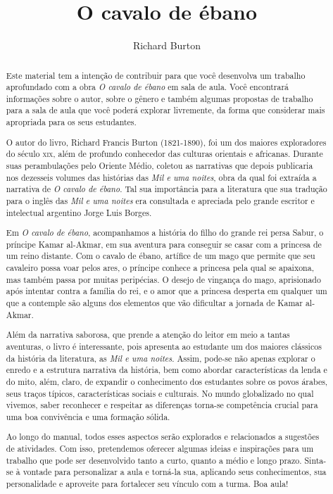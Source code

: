 \documentclass[11pt]{extarticle}
\newcommand{\AutorLivro}{Richard Burton}
\newcommand{\TituloLivro}{O cavalo de ébano}
\newcommand{\colaborador}{Paulo Pompermaier}
\begin{document}
\title{\TituloLivro}
\author{\AutorLivro}
\def\authornotes{\colaborador}

\date{}
\maketitle

\tableofcontents

\begin{abstract}
Este material tem a intenção de contribuir para que você desenvolva um trabalho aprofundado com a obra \textit{O cavalo de ébano} em sala de aula.
Você encontrará informações sobre o autor, sobre o gênero e também 
algumas propostas de trabalho para a sala de aula que você poderá explorar livremente, 
da forma que considerar mais apropriada para os seus estudantes.

O autor do livro, Richard Francis Burton (1821-1890), foi um dos maiores
exploradores do século \textsc{xix}, além de profundo conhecedor das culturas orientais e africanas. Durante suas perambulações pelo Oriente Médio, coletou as narrativas que depois publicaria nos dezesseis volumes das histórias das \textit{Mil e uma noites}, obra da qual foi extraída a narrativa de \textit{O cavalo de ébano}. Tal sua importância para a literatura que sua tradução para o inglês das \textit{Mil e uma noites} era consultada e apreciada pelo grande escritor e intelectual argentino Jorge Luis Borges.

Em \textit{O cavalo de ébano}, acompanhamos a história do filho do grande rei persa Sabur, o príncipe Kamar al-Akmar, em sua aventura para conseguir se casar com a princesa de um reino distante. Com o cavalo de ébano, artífice de um mago que permite que seu cavaleiro possa voar pelos ares, o príncipe conhece a princesa pela qual se apaixona, mas também passa por muitas peripécias. O desejo de vingança do mago, aprisionado após intentar contra a família do rei, e o amor que a princesa desperta em qualquer um que a contemple são alguns dos elementos que vão dificultar a jornada de Kamar al-Akmar.

Além da narrativa saborosa, que prende a atenção do leitor em meio a tantas aventuras, o livro é interessante, pois apresenta ao estudante um dos maiores clássicos da história da literatura, as \textit{Mil e uma noites}. Assim, pode-se não apenas explorar o enredo e a estrutura narrativa da história, bem como abordar características da lenda e do mito, além, claro, de expandir o conhecimento dos estudantes sobre os povos árabes, seus traços típicos, características sociais e culturais. No mundo globalizado no qual vivemos, saber reconhecer e respeitar as diferenças torna-se competência crucial para uma boa convivência e uma formação sólida.

Ao longo do manual, todos esses aspectos serão explorados e relacionados a sugestões de atividades. Com isso, pretendemos oferecer algumas ideias e inspirações para um trabalho que pode ser desenvolvido tanto a curto, quanto a médio e longo prazo. Sinta-se à vontade para personalizar a aula e torná-la sua, aplicando seus conhecimentos, sua 
personalidade e aproveite para fortalecer seu vínculo com a turma.
Boa aula!
\end{abstract}
\end{document}
